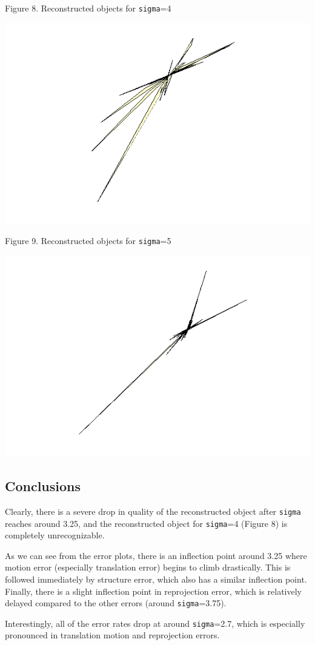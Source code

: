 \documentclass{article}
\begin{document}
\begin{center}
	\newpage
	\begin{center}Figure 8. Reconstructed objects for \texttt{sigma}=4\end{center}
	\includegraphics[width=.5\textwidth]{4sigma.png}
	\begin{center}Figure 9. Reconstructed objects for \texttt{sigma}=5\end{center}
	\includegraphics[width=.5\textwidth]{5sigma.png}

\end{center}


\subsection{Conclusions}

Clearly, there is a severe drop in quality of the reconstructed object after \texttt{sigma} reaches around 3.25, and the reconstructed object for \texttt{sigma}=4 (Figure 8) is completely unrecognizable.

As we can see from the error plots, there is an inflection point around 3.25 where motion error (especially translation error) begins to climb drastically. This is followed immediately by structure error, which also has a similar inflection point. Finally, there is a slight inflection point in reprojection error, which is relatively delayed compared to the other errors (around \texttt{sigma}=3.75).

Interestingly, all of the error rates drop at around \texttt{sigma}=2.7, which is especially pronounced in translation motion and reprojection errors.
\end{document}
